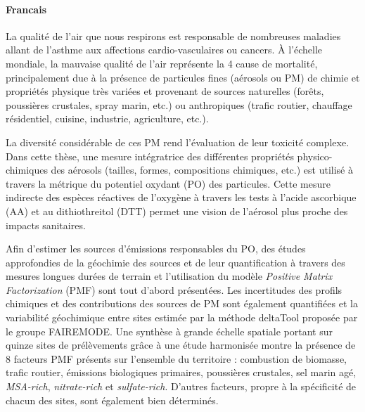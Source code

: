 
\paragraph{Francais}%
\label{par:francais}

La qualité de l'air que nous respirons est responsable de nombreuses maladies allant de
l'asthme aux affections cardio-vasculaires ou cancers. À l'échelle mondiale, la mauvaise
qualité de l'air représente la
4\ieme{} cause de mortalité, principalement due à la
présence de particules fines (aérosols ou PM) de chimie et propriétés physique très
variées et
provenant de sources naturelles (forêts, poussières crustales, spray marin, etc.) ou
anthropiques (trafic routier, chauffage résidentiel, cuisine, industrie, agriculture,
etc.).

La diversité considérable de ces PM rend l'évaluation de leur toxicité complexe. Dans
cette thèse, 
une mesure intégratrice des différentes propriétés physico-chimiques des
aérosols (tailles, formes, compositions chimiques, etc.) est utilisé à travers la
métrique du potentiel oxydant (PO) des particules.
Cette mesure indirecte des espèces réactives de l'oxygène à travers les tests à l'acide
ascorbique (AA) et au dithiothreitol (DTT) permet une vision de l'aérosol plus proche des
impacts sanitaires.

Afin d'estimer les sources d'émissions responsables du PO, des études approfondies de la
géochimie des sources et de leur quantification à travers des mesures longues durées de
terrain et l'utilisation du modèle \textit{Positive Matrix Factorization} (PMF) sont tout
d'abord présentées. Les incertitudes des profils chimiques et des contributions
des sources de PM sont également quantifiées et la variabilité géochimique entre sites
estimée par la méthode deltaTool proposée par le groupe FAIREMODE. Une synthèse à grande
échelle spatiale portant sur quinze sites de prélèvements grâce à une étude harmonisée
montre la présence de 8 facteurs PMF présents sur l'ensemble du territoire : combustion de
biomasse, trafic routier, émissions biologiques primaires, poussières crustales, sel marin
agé, \textit{MSA-rich}, \textit{nitrate-rich} et \textit{sulfate-rich}. D'autres facteurs,
propre à la spécificité de chacun des sites, sont également bien déterminés.

